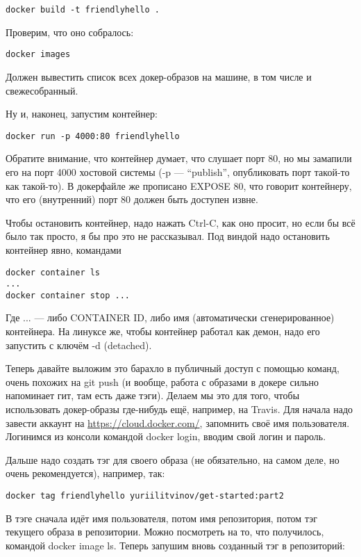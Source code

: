 \documentclass[a5paper]{article}
\begin{document}
\begin{verbatim}
docker build -t friendlyhello .
\end{verbatim}

Проверим, что оно собралось:
\begin{verbatim}
docker images
\end{verbatim}

Должен вывестить список всех докер-образов на машине, в том числе и свежесобранный.

Ну и, наконец, запустим контейнер:

\begin{verbatim}
docker run -p 4000:80 friendlyhello
\end{verbatim}

Обратите внимание, что контейнер думает, что слушает порт 80, но мы замапили его на порт 4000 хостовой системы (-p --- ``publish'', опубликовать порт такой-то как такой-то). В докерфайле же прописано EXPOSE 80, что говорит контейнеру, что его (внутренний) порт 80 должен быть доступен извне.

Чтобы остановить контейнер, надо нажать Ctrl-C, как оно просит, но если бы всё было так просто, я бы про это не рассказывал. Под виндой надо остановить контейнер явно, командами

\begin{verbatim}
docker container ls
...
docker container stop ...
\end{verbatim}
	
Где ... --- либо CONTAINER ID, либо имя (автоматически сгенерированное) контейнера. На линуксе же, чтобы контейнер работал как демон, надо его запустить с ключём -d (detached).

Теперь давайте выложим это барахло в публичный доступ с помощью команд, очень похожих на git push (и вообще, работа с образами в докере сильно напоминает гит, там есть даже тэги). Делаем мы это для того, чтобы использовать докер-образы где-нибудь ещё, например, на Travis. Для начала надо завести аккаунт на \url{https://cloud.docker.com/}, запомнить своё имя пользователя. Логинимся из консоли командой docker login, вводим свой логин и пароль.

Дальше надо создать тэг для своего образа (не обязательно, на самом деле, но очень рекомендуется), например, так:

\begin{verbatim}
docker tag friendlyhello yuriilitvinov/get-started:part2
\end{verbatim}

В тэге сначала идёт имя пользователя, потом имя репозитория, потом тэг текущего образа в репозитории. Можно посмотреть на то, что получилось, командой docker image ls. Теперь запушим вновь созданный тэг в репозиторий:
\end{document}
